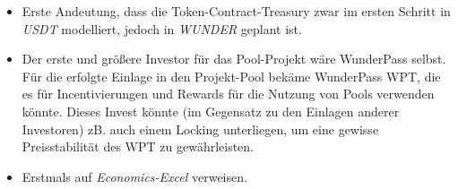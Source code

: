 \begin{Abgrenzung}
\vspace{0.2cm}


\todo{\noindent\hrulefill}
\vspace{0.3cm}


\begin{itemize}
	\item Erste Andeutung, dass die Token-Contract-Treasury zwar im ersten Schritt in \textit{USDT} modelliert, jedoch in \textit{WUNDER} geplant ist.
\end{itemize}

\end{Abgrenzung}


\vspace{0.3cm}

\begin{itemize}
	\item Der erste und größere Investor für das Pool-Projekt wäre WunderPass selbst. Für die erfolgte Einlage in den Projekt-Pool bekäme WunderPass WPT, die es für Incentivierungen und Rewards für die Nutzung von Pools verwenden könnte. Dieses Invest könnte (im Gegensatz zu den Einlagen anderer Investoren) zB. auch einem Locking unterliegen, um eine gewisse Preisstabilität des WPT zu gewährleisten.	
	\item Erstmals auf \textit{Economics-Excel} verweisen.
\end{itemize}

